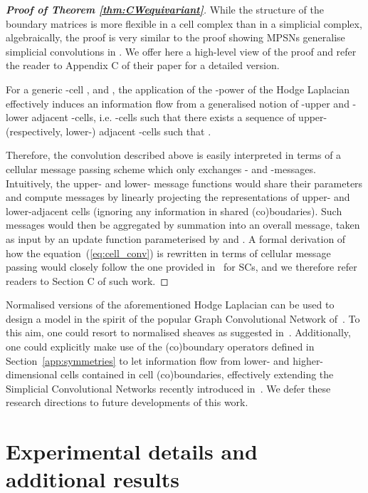 \documentclass{article}
\def\eqref#1{equation~\ref{#1}}
\renewcommand{\eqref}[1]{(\ref{#1})}
\begin{document}
\begin{proof}[\textbf{Proof of Theorem \ref{thm:CWequivariant}}] While the structure of the boundary matrices is more flexible in a cell complex than in a simplicial complex, algebraically, the proof is very similar to the proof showing MPSNs generalise simplicial convolutions in \citet{bodnar2021weisfeiler}. We offer here a high-level view of the proof and refer the reader to Appendix C of their paper for a detailed version. 

For a generic -cell , and , the application of the -power of the Hodge Laplacian effectively induces an information flow from a generalised notion of -upper and -lower adjacent -cells, i.e. -cells  such that there exists a sequence of upper- (respectively, lower-) adjacent -cells  such that .

Therefore, the convolution described above is easily interpreted in terms of a cellular message passing scheme which only exchanges - and -messages. Intuitively, the upper- and lower- message functions would share their parameters  and compute messages by linearly projecting the representations of upper- and lower-adjacent cells (ignoring any information in shared (co)boudaries). Such messages would then be aggregated by summation into an overall message, taken as input by an update function parameterised by  and . A formal derivation of how the equation~\eqref{eq:cell_conv} is rewritten in terms of cellular message passing would closely follow the one provided in~\citet{bodnar2021weisfeiler} for SCs, and we therefore refer readers to Section C of such work. \end{proof}

Normalised versions of the aforementioned Hodge Laplacian can be used to design a model in the spirit of the popular Graph Convolutional Network of~\citet{kipf2017graph}. To this aim, one could resort to normalised sheaves as suggested in~\cite{HGh19}. Additionally, one could explicitly make use of the (co)boundary operators defined in Section~\ref{app:symmetries} to let information flow from lower- and higher- dimensional cells contained in cell (co)boundaries, effectively extending the Simplicial Convolutional Networks recently introduced in~\citet{bunch2020simplicial}. We defer these research directions to future developments of this work.


\section{Experimental details and additional results}\label{app:results}
\end{document}
